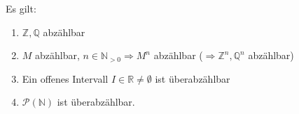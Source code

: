 \begin{proposition}
	Es gilt:
	\begin{enumerate}[label={\arabic*)}]
		\item $\mathbb{Z},\mathbb{Q}$ abzählbar
		\item $M$ abzählbar, $n\in\mathbb{N}_{>0} \Rightarrow M^n$ abzählbar ($\Rightarrow \mathbb{Z}^n, \mathbb{Q}^n$ abzählbar)
		\item Ein offenes Intervall $I\in\mathbb{R}\neq \emptyset $ ist überabzählbar
		\item $\mathcal{P}(\mathbb{N})$ ist überabzählbar.
	\end{enumerate}
\end{proposition}